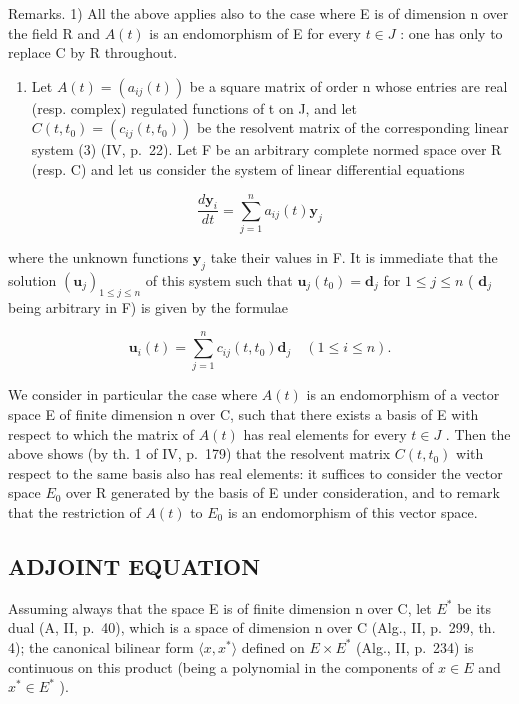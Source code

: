 Remarks. 1) All the above applies also to the case where E is of dimension n over the field R and \(A(t)\) is an endomorphism of E for every \(t \in J\) : one has only to replace C by R throughout.

\begin{enumerate}
\def\labelenumi{\arabic{enumi})}
\setcounter{enumi}{1}
\tightlist
\item
  Let \(A(t) = (a_{ij}(t))\) be a square matrix of order n whose entries are real (resp. complex) regulated functions of t on J, and let \(C(t, t_0) = (c_{ij}(t, t_0))\) be the resolvent matrix of the corresponding linear system (3) (IV, p.~22). Let F be an arbitrary complete normed space over R (resp. C) and let us consider the system of linear differential equations
\end{enumerate}

\[
\frac {d \mathbf {y} _ {i}}{d t} = \sum_ {j = 1} ^ {n} a _ {i j} (t) \mathbf {y} _ {j}
\]

where the unknown functions \(\mathbf{y}_j\) take their values in F. It is immediate that the solution \((\mathbf{u}_j)_{1\leqslant j\leqslant n}\) of this system such that \(\mathbf{u}_j(t_0) = \mathbf{d}_j\) for \(1\leqslant j\leqslant n\) ( \(\mathbf{d}_j\) being arbitrary in F) is given by the formulae

\[
\mathbf {u} _ {i} (t) = \sum_ {j = 1} ^ {n} c _ {i j} (t, t _ {0}) \mathbf {d} _ {j} \quad (1 \leqslant i \leqslant n).
\]

We consider in particular the case where \(A(t)\) is an endomorphism of a vector space E of finite dimension n over C, such that there exists a basis of E with respect to which the matrix of \(A(t)\) has real elements for every \(t \in J\) . Then the above shows (by th. 1 of IV, p.~179) that the resolvent matrix \(C(t, t_{0})\) with respect to the same basis also has real elements: it suffices to consider the vector space \(E_{0}\) over R generated by the basis of E under consideration, and to remark that the restriction of \(A(t)\) to \(E_{0}\) is an endomorphism of this vector space.

\subsection{ADJOINT EQUATION}

Assuming always that the space E is of finite dimension n over C, let \(E^{*}\) be its dual (A, II, p.~40), which is a space of dimension n over C (Alg., II, p.~299, th. 4); the canonical bilinear form \(\langle x, x^{*}\rangle\) defined on \(E \times E^{*}\) (Alg., II, p.~234) is continuous on this product (being a polynomial in the components of \(x \in E\) and \(x^{*} \in E^{*}\) ).

